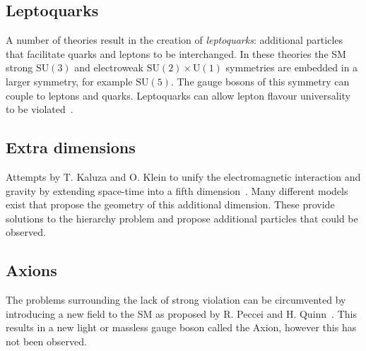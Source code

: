 \subsection{Leptoquarks}

A number of theories result in the creation of \emph{leptoquarks}: additional particles that facilitate quarks and leptons to be interchanged. In these theories the SM strong $\text{SU}(3)$ and electroweak $\text{SU}(2)\times\text{U}(1)$ symmetries are embedded in a larger symmetry, for example $\text{SU}(5)$. The gauge bosons of this symmetry can couple to leptons and quarks. Leptoquarks can allow lepton flavour universality to be violated~\cite{PhysRevD.97.015019}. 

\subsection{Extra dimensions}
Attempts by T. Kaluza and O. Klein to unify the electromagnetic interaction and gravity by extending space-time into a fifth dimension~\cite{Kaluza:1921tu,Klein1926}. Many different models exist that propose the geometry of this additional dimension. These provide solutions to the hierarchy problem and propose additional particles that could be observed. 


\subsection{Axions}
The problems surrounding the lack of strong \CP violation can be circumvented by introducing a new field to the SM as proposed by R. Peccei and H. Quinn~\cite{PhysRevLett.38.1440}. This results in a new light or massless gauge boson called the Axion, however this has not been observed.     

